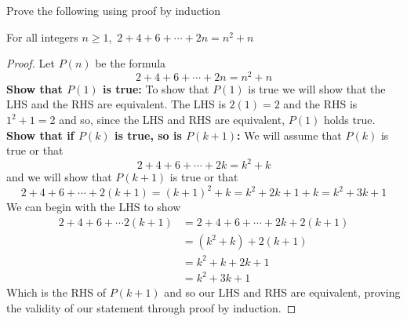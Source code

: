\documentclass[addpoints]{exam}
\begin{document}
\begin{questions}
	\question Prove the following using proof by induction
	\begin{center}
		For all integers $n \geq 1$, $\displaystyle\, 2 + 4 + 6 + \cdots + 2n = n^2 + n$
	\end{center}
	\begin{solution}[\stretch{1}]
		\begin{proof}
			Let $P(n)$ be the formula
			\[
				2 + 4 + 6 + \cdots + 2n = n^2 + n
			\]
			\textbf{Show that $P(1)$ is true:} To show that $P(1)$ is true we will show that the LHS and the RHS are equivalent. The LHS is $2(1)=2$ and the RHS is $1^2 + 1 = 2$ and so, since the LHS and RHS are equivalent, $P(1)$ holds true.
			\newline\textbf{Show that if $P(k)$ is true, so is $P(k+1)$:} We will assume that $P(k)$ is true or that
			\[
				2 + 4 + 6 + \cdots + 2k = k^2 + k
			\]
			and we will show that $P(k+1)$ is true or that
			\[
				2 + 4 + 6 + \cdots + 2(k+1) = (k+1)^2 + k = k^2 + 2k + 1 + k = k^2 + 3k + 1
			\]
			We can begin with the LHS to show
			\begin{align*}
				2 + 4 + 6 + \cdots 2(k+1) & = 2 + 4 + 6 + \cdots + 2k + 2(k+1) \\
				                          & = (k^2 + k) + 2(k+1)               \\
				                          & = k^2 + k + 2k + 1                 \\
				                          & = k^2 + 3k + 1
			\end{align*}
			Which is the RHS of $P(k+1)$ and so our LHS and RHS are equivalent, proving the validity of our statement through proof by induction.
		\end{proof}
	\end{solution}

	\newpage


\end{questions}
\end{document}
